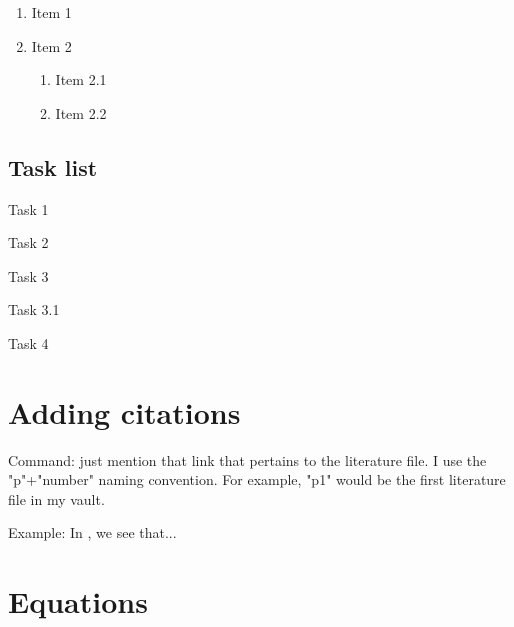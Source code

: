 \documentclass{extarticle}
\begin{document}
\begin{enumerate}

\item Item 1

\item Item 2

\begin{enumerate}

\item Item 2.1

\item Item 2.2

\end{enumerate}

\end{enumerate}



\subsection{Task list}

\begin{todolist}

\item Task 1

\item Task 2

\item Task 3

\begin{todolist}

\item Task 3.1

\end{todolist}

\item Task 4

\end{todolist}

\section{Adding citations}
Command: just mention that link that pertains to the literature file. I use the "p"+"number" naming convention. For example, "p1" would be the first literature file in my vault.



Example: In \cite{p1}, we see that...  \hypertarget{ad3b86}{}



\section{Equations}
\end{document}
